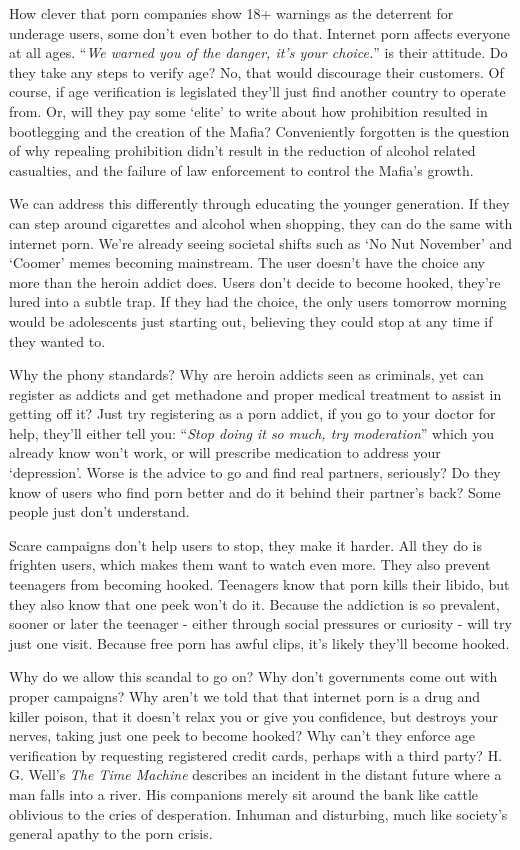\documentclass[
]{book}
\begin{document}
How clever that porn companies show 18+ warnings as the deterrent for underage users, some don't even bother to do that. Internet porn affects everyone at all ages. ``\emph{We warned you of the danger, it's your choice.}'' is their attitude. Do they take any steps to verify age? No, that would discourage their customers. Of course, if age verification is legislated they'll just find another country to operate from. Or, will they pay some `elite' to write about how prohibition resulted in bootlegging and the creation of the Mafia? Conveniently forgotten is the question of why repealing prohibition didn't result in the reduction of alcohol related casualties, and the failure of law enforcement to control the Mafia's growth.

We can address this differently through educating the younger generation. If they can step around cigarettes and alcohol when shopping, they can do the same with internet porn. We're already seeing societal shifts such as `No Nut November' and `Coomer' memes becoming mainstream. The user doesn't have the choice any more than the heroin addict does. Users don't decide to become hooked, they're lured into a subtle trap. If they had the choice, the only users tomorrow morning would be adolescents just starting out, believing they could stop at any time if they wanted to.

Why the phony standards? Why are heroin addicts seen as criminals, yet can register as addicts and get methadone and proper medical treatment to assist in getting off it? Just try registering as a porn addict, if you go to your doctor for help, they'll either tell you: ``\emph{Stop doing it so much, try moderation}'' which you already know won't work, or will prescribe medication to address your `depression'. Worse is the advice to go and find real partners, seriously? Do they know of users who find porn better and do it behind their partner's back? Some people just don't understand.

Scare campaigns don't help users to stop, they make it harder. All they do is frighten users, which makes them want to watch even more. They also prevent teenagers from becoming hooked. Teenagers know that porn kills their libido, but they also know that one peek won't do it. Because the addiction is so prevalent, sooner or later the teenager - either through social pressures or curiosity - will try just one visit. Because free porn has awful clips, it's likely they'll become hooked.

Why do we allow this scandal to go on? Why don't governments come out with proper campaigns? Why aren't we told that that internet porn is a drug and killer poison, that it doesn't relax you or give you confidence, but destroys your nerves, taking just one peek to become hooked? Why can't they enforce age verification by requesting registered credit cards, perhaps with a third party? H. G. Well's \emph{The Time Machine} describes an incident in the distant future where a man falls into a river. His companions merely sit around the bank like cattle oblivious to the cries of desperation. Inhuman and disturbing, much like society's general apathy to the porn crisis.
\end{document}
